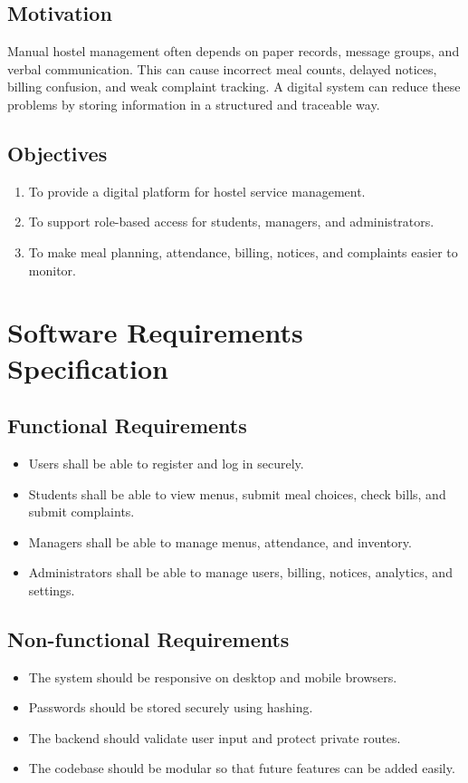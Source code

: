 \documentclass[12pt,a4paper]{report}
\begin{document}
\section{Motivation}
Manual hostel management often depends on paper records, message groups, and verbal communication. This can cause incorrect meal counts, delayed notices, billing confusion, and weak complaint tracking. A digital system can reduce these problems by storing information in a structured and traceable way.

\section{Objectives}
\begin{enumerate}
    \item To provide a digital platform for hostel service management.
    \item To support role-based access for students, managers, and administrators.
    \item To make meal planning, attendance, billing, notices, and complaints easier to monitor.
\end{enumerate}

\chapter{Software Requirements Specification}
\section{Functional Requirements}
\begin{itemize}
    \item Users shall be able to register and log in securely.
    \item Students shall be able to view menus, submit meal choices, check bills, and submit complaints.
    \item Managers shall be able to manage menus, attendance, and inventory.
    \item Administrators shall be able to manage users, billing, notices, analytics, and settings.
\end{itemize}

\section{Non-functional Requirements}
\begin{itemize}
    \item The system should be responsive on desktop and mobile browsers.
    \item Passwords should be stored securely using hashing.
    \item The backend should validate user input and protect private routes.
    \item The codebase should be modular so that future features can be added easily.
\end{itemize}
\end{document}
